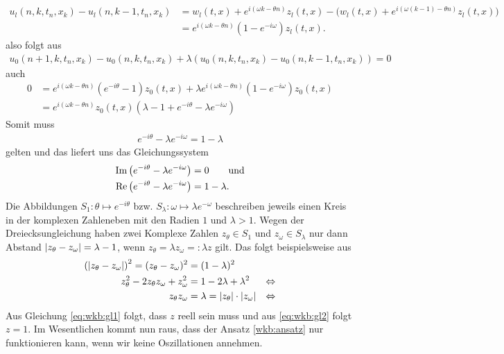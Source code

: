 {\small\begin{align}\nonumber
u_l(n,k,t_n,x_k) - u_l(n,k-1,t_n,x_k)
&= w_l(t,x) + e^{i (\omega k - \theta n)} z_l(t,x) - \bigl( w_l(t,x) + e^{i (\omega (k-1) - \theta n)} z_l(t,x) \bigr)\\
&= e^{i (\omega k - \theta n)} (1 - e^{-i \omega}) z_l(t,x).
\end{align}
also folgt aus
\begin{align}\label{eq:wkb:bed1}
u_0(n+1,k,t_n,x_k) - u_0(n,k,t_n,x_k) + \lambda (u_0(n,k,t_n,x_k) - u_0(n,k-1,t_n,x_k)) = 0
\end{align}
auch
\begin{align}
0 &= e^{i (\omega k - \theta n)} (e^{-i\theta} - 1) z_0(t,x) + \lambda e^{i (\omega k - \theta n)} (1 - e^{-i \omega}) z_0(t,x)\\
&= e^{i (\omega k - \theta n)} z_0(t,x) ( \lambda - 1 + e^{-i\theta} - \lambda e^{-i \omega} )
\end{align}
Somit muss
\begin{align}
e^{-i \theta} - \lambda e^{-i \omega} = 1 - \lambda
\end{align}
gelten und das liefert uns das Gleichungssystem
\begin{align}\label{eq:wkb:gl1}
\operatorname{Im}\left( e^{-i \theta} - \lambda e^{-i \omega} \right) &= 0 \qquad \text{und}\\
\operatorname{Re}\left( e^{-i \theta} - \lambda e^{-i \omega} \right) &= 1 - \lambda. \label{eq:wkb:gl2}
\end{align}
Die Abbildungen $S_1\colon \theta \mapsto e^{-i \theta}$ bzw. $S_\lambda\colon \omega \mapsto \lambda e^{- \omega}$ beschreiben jeweils einen Kreis in der komplexen Zahleneben mit den Radien $1$ und $\lambda > 1$.
Wegen der Dreiecksungleichung haben zwei Komplexe Zahlen $z_\theta \in S_1$ und $z_\omega \in S_\lambda$ nur dann Abstand $\left| z_\theta - z_\omega \right| = \lambda-1$, wenn $z_\theta = \lambda z_\omega =: \lambda z$ gilt.
Das folgt beispielsweise aus
\begin{align}
\left(\left| z_\theta - z_\omega \right|\right)^2 = (z_\theta - z_\omega)^2 &= (1 - \lambda)^2\\
z_\theta^2 - 2 z_\theta z_\omega + z_\omega^2 &= 1 - 2 \lambda + \lambda^2 & \Leftrightarrow\\
z_\theta z_\omega &= \lambda = \left| z_\theta \right| \cdot \left| z_\omega \right|  &\Leftrightarrow
\end{align}
Aus Gleichung \eqref{eq:wkb:gl1} folgt, dass $z$ reell sein muss und aus \eqref{eq:wkb:gl2} folgt $z = 1$.
Im Wesentlichen kommt nun raus, dass der Ansatz \eqref{wkb:ansatz} nur funktionieren kann, wenn wir keine Oszillationen annehmen.
}
